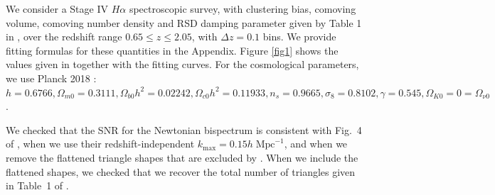 We consider a Stage IV $H \alpha$ spectroscopic survey, with clustering bias, comoving volume, comoving  number density and RSD damping parameter given by Table 1 in \cite{Yankelevich:2018uaz}, over the redshift range {$0.65\leq z\leq 2.05$}, with  $\Delta z=0.1$ bins. 
We provide fitting formulas for these quantities in the Appendix.
Figure \ref{fig1} shows the values given in \cite{Yankelevich:2018uaz} together with the fitting curves. For the  cosmological parameters, we use Planck 2018  \cite{Aghanim:2018eyx}:
$h = 0.6766, \Omega_{m0} = 0.3111,
 \Omega_{b0}h^{2}= 0.02242,
\Omega_{c0} h^{2} = 0.11933,
n_s = 0.9665,
\sigma_8 = 0.8102, \gamma=0.545,
\Omega_{K0} = 0= \Omega_{\nu 0}$.

We checked that the SNR for the Newtonian bispectrum is consistent with Fig.~4 of \cite{Yankelevich:2018uaz}, when we use their redshift-independent $k_{\mathrm{max}} = 0.15h\;\mathrm{Mpc}^{-1}$, and when we remove the flattened triangle shapes that are excluded by \cite{Yankelevich:2018uaz}. When we include the flattened shapes, we checked that we recover the total number of triangles given in Table~1 of \cite{Oddo:2019run}.
%
